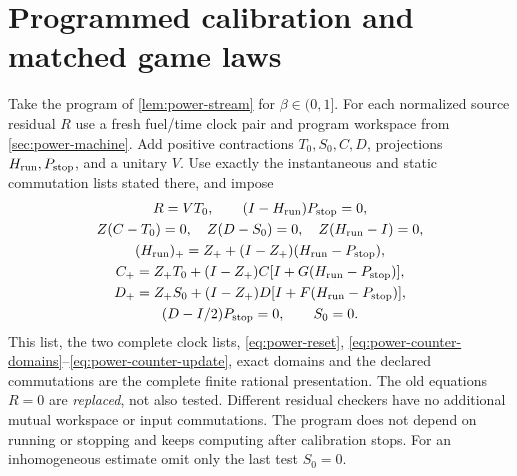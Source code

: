 \section{Programmed calibration and matched game laws}\label{sec:power-calibration}
Take the program of \cref{lem:power-stream} for $\beta\in(0,1]$. For each normalized source residual $R$ use a fresh fuel/time clock pair and program workspace from \cref{sec:power-machine}. Add positive contractions $T_0,S_0,C,D$, projections $H_{\rm run},P_{\rm stop}$, and a unitary $V$. Use exactly the instantaneous and static commutation lists stated there, and impose
\begin{equation}\label{eq:power-calibrator}
 \begin{gathered}
 R=VT_0,\qquad (I-H_{\rm run})P_{\rm stop}=0,\\
 Z(C-T_0)=0,\quad Z(D-S_0)=0,\quad Z(H_{\rm run}-I)=0,\\
 (H_{\rm run})_+=Z_++(I-Z_+)(H_{\rm run}-P_{\rm stop}),\\
 C_+=Z_+T_0+(I-Z_+)C[I+G(H_{\rm run}-P_{\rm stop})],\\
 D_+=Z_+S_0+(I-Z_+)D[I+F(H_{\rm run}-P_{\rm stop})],\\
 (D-I/2)P_{\rm stop}=0,\qquad S_0=0.
 \end{gathered}
\end{equation}
This list, the two complete clock lists, \eqref{eq:power-reset}, \eqref{eq:power-counter-domains}--\eqref{eq:power-counter-update}, exact domains and the declared commutations are the complete finite rational presentation. The old equations $R=0$ are \emph{replaced}, not also tested. Different residual checkers have no additional mutual workspace or input commutations. The program does not depend on running or stopping and keeps computing after calibration stops. For an inhomogeneous estimate omit only the last test $S_0=0$.

